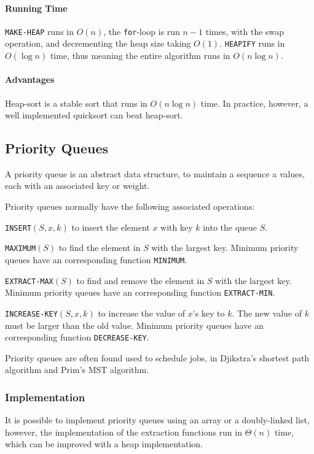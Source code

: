 \documentclass[10pt]{article}
\begin{document}
\paragraph{Running Time}\texttt{MAKE-HEAP} runs in $O(n)$, the \texttt{for}-loop is run $n-1$ times, with the swap operation, and decrementing the heap size taking $O(1)$.  \texttt{HEAPIFY} runs in $O(\log n)$ time, thus meaning the entire algorithm runs in $O(n\log n)$.
\paragraph{Advantages}Heap-sort is a stable sort that runs in $O(n\log n)$ time. In practice, however, a well implemented quicksort can beat heap-sort. 
\subsection{Priority Queues}
A priority queue is an abstract data structure, to maintain a sequence a values, each with an associated key or weight.

Priority queues normally have the following associated operations:
\begin{itemize*}
	\item \texttt{INSERT$(S,x,k)$} to insert the element $x$ with key $k$ into the queue $S$.
	\item \texttt{MAXIMUM$(S)$} to find the element in $S$ with the largest key. Minimum priority queues have an corresponding function \texttt{MINIMUM}.
	\item \texttt{EXTRACT-MAX$(S)$} to find and remove the element in $S$ with the largest key. Minimum priority queues have an corresponding function \texttt{EXTRACT-MIN}.
	\item \texttt{INCREASE-KEY$(S,x,k)$} to increase the value of $x$'s key to $k$.  The new value of $k$ must be larger than the old value. Minimum priority queues have an corresponding function \texttt{DECREASE-KEY}.
\end{itemize*}
Priority queues are often found used to schedule jobs, in Djikstra's shortest path algorithm and Prim's MST algorithm.
\subsubsection{Implementation}
It is possible to implement priority queues using an array or a doubly-linked list, however, the implementation of the extraction functions run in $\Theta(n)$ time, which can be improved with a heap implementation.
\end{document}
